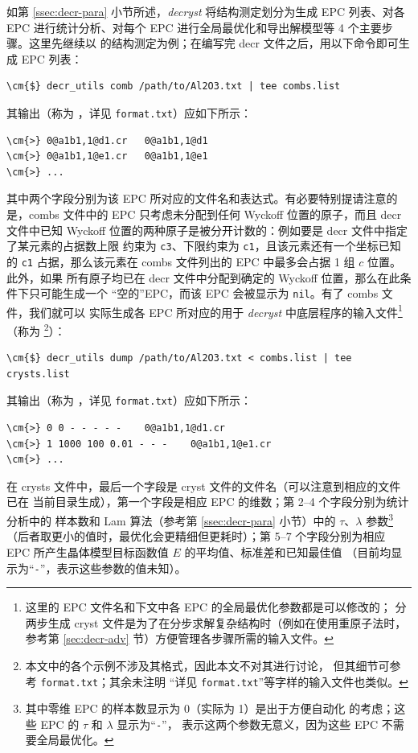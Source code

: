 如第 \ref{ssec:decr-para} 小节所述，\emph{decryst} 将结构测定划分为生成
EPC 列表、对各 EPC 进行统计分析、对每个 EPC 进行全局最优化和导出解模型等
4 个主要步骤。这里先继续以  的结构测定为例；在编写完 decr
文件之后，用以下命令即可生成 EPC 列表：
\begin{Verbatim}
\cm{$} decr_utils comb /path/to/Al2O3.txt | tee combs.list
\end{Verbatim}
其输出（称为 ，详见 \verb|format.txt|）应如下所示：
\begin{Verbatim}
\cm{>} 0@a1b1,1@d1.cr	0@a1b1,1@d1
\cm{>} 0@a1b1,1@e1.cr	0@a1b1,1@e1
\cm{>} ...
\end{Verbatim}
其中两个字段分别为该 EPC 所对应的文件名和表达式。有必要特别提请注意的是，combs
文件中的 EPC 只考虑未分配到任何 Wyckoff 位置的原子，而且 decr 文件中已知 Wyckoff
位置的两种原子是被分开计数的：例如要是 decr 文件中指定了某元素的占据数上限
约束为 \verb|c3|、下限约束为 \verb|c1|，且该元素还有一个坐标已知的 \verb|c1|
占据，那么该元素在 combs 文件列出的 EPC 中最多会占据 1 组 $c$ 位置。此外，如果
所有原子均已在 decr 文件中分配到确定的 Wyckoff 位置，那么在此条件下只可能生成一个
“空的”EPC，而该 EPC 会被显示为 \verb|nil|。有了 combs 文件，我们就可以
实际生成各 EPC 所对应的用于 \emph{decryst} 中底层程序的输入文件\footnote{%
	这里的 EPC 文件名和下文中各 EPC 的全局最优化参数都是可以修改的；
	分两步生成 cryst 文件是为了在分步求解复杂结构时（例如在使用重原子法时，
	参考第 \ref{sec:decr-adv} 节）方便管理各步骤所需的输入文件。%
}（称为 \footnote{%
	本文中的各个示例不涉及其格式，因此本文不对其进行讨论，
	但其细节可参考 \texttt{format.txt}；其余未注明
	“详见 \texttt{format.txt}”等字样的输入文件也类似。%
}）：
\begin{Verbatim}
\cm{$} decr_utils dump /path/to/Al2O3.txt < combs.list | tee crysts.list
\end{Verbatim}
其输出（称为 ，详见 \verb|format.txt|）应如下所示：
\begin{Verbatim}
\cm{>} 0 0 - - - - -	0@a1b1,1@d1.cr
\cm{>} 1 1000 100 0.01 - - -	0@a1b1,1@e1.cr
\cm{>} ...
\end{Verbatim}
在 crysts 文件中，最后一个字段是 cryst 文件的文件名（可以注意到相应的文件已在
当前目录生成），第一个字段是相应 EPC 的维数；第 2--4 个字段分别为统计分析中的
样本数和 Lam 算法（参考第 \ref{ssec:decr-para} 小节）中的
$\tau$、$\lambda$ 参数\footnote{%
	其中零维 EPC 的样本数显示为 0（实际为 1）是出于方便自动化
	的考虑；这些 EPC 的 $\tau$ 和 $\lambda$ 显示为“\texttt{-}”，
	表示这两个参数无意义，因为这些 EPC 不需要全局最优化。%
}（后者取更小的值时，最优化会更精细但更耗时）；第 5--7 个字段分别为相应
EPC 所产生晶体模型目标函数值 $E$ 的平均值、标准差和已知最佳值
（目前均显示为“\texttt{-}”，表示这些参数的值未知）。

